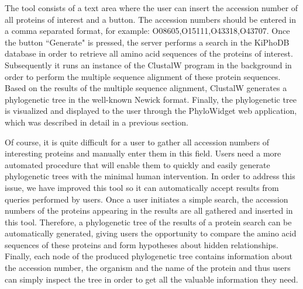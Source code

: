 The tool consists of a text area where the user can insert the accession number of all proteins of interest and a button.
The accession numbers should be entered in a comma separated format, for example: O08605,O15111,O43318,O43707.
Once the button ``Generate" is pressed, the server performs a search in the KiPhoDB database in order to retrieve all amino acid sequences of the proteins of interest.
Subsequently it runs an instance of the ClustalW program in the background in order to perform the multiple sequence alignment of these protein sequences.
Based on the results of the multiple sequence alignment, ClustalW generates a phylogenetic tree in the well-known Newick format.
Finally, the phylogenetic tree is visualized and displayed to the user through the PhyloWidget web application, which was described in detail in a previous section.

Of course, it is quite difficult for a user to gather all accession numbers of interesting proteins and manually enter them in this field.
Users need a more automated procedure that will enable them to quickly and easily generate phylogenetic trees with the minimal human intervention.
In order to address this issue, we have improved this tool so it can automatically accept results from queries performed by users.
Once a user initiates a simple search, the accession numbers of the proteins appearing in the results are all gathered and inserted in this tool.
Therefore, a phylogenetic tree of the results of a protein search can be automatically generated, giving users the opportunity to compare the amino acid sequences of these proteins and form hypotheses about hidden relationships.
Finally, each node of the produced phylogenetic tree contains information about the accession number, the organism and the name of the protein and thus users can simply inspect the tree in order to get all the valuable information they need.

